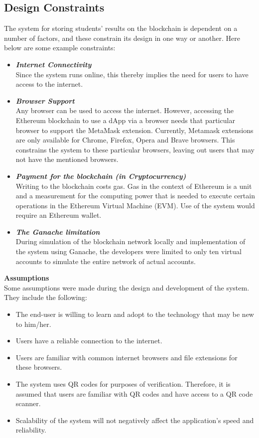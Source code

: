 \subsection{Design Constraints}
The system for storing students' results on the blockchain is dependent on a number of factors, and these constrain its design in one way or another. Here below are some example constraints: 
\begin{itemize}
\item \textbf{\textit{Internet Connectivity}}\\
Since the system runs online, this thereby implies the need for users to have access to the internet.
\item \textbf{\textit{Browser Support}}\\
Any browser can be used to access the internet. However, accessing the Ethereum blockchain to use a dApp via a browser needs that particular browser to support the MetaMask extension. Currently, Metamask extensions are only available for Chrome, Firefox, Opera and Brave browsers. This constrains the system to these particular browsers, leaving out users that may not have the mentioned browsers.
\item \textbf{\textit{Payment for the blockchain (in Cryptocurrency)}}\\
Writing to the blockchain costs gas. Gas in the context of Ethereum is a unit and a measurement for the computing power that is needed to execute certain operations in the Ethereum Virtual Machine (EVM). Use of the system would require an Ethereum wallet\cite{art21}.
\item \textbf{\textit{The Ganache limitation}}\\
During simulation of the blockchain network locally and implementation of the system using Ganache, the developers were limited to only ten virtual accounts to simulate the entire network of actual accounts.
\end{itemize}
\textbf{Assumptions}\\
Some assumptions were made during the design and development of the system. They include the following:\\
\begin{itemize}
\item The end-user is willing to learn and adopt to the technology that may be new to him/her.
\item Users have a reliable connection to the internet.
\item Users are familiar with common internet browsers and file extensions for these browsers.
\item The system uses QR codes for purposes of verification. Therefore, it is assumed that users are familiar with QR codes and have access to a QR code scanner.
\item Scalability of the system will not negatively affect the application’s speed and reliability.
\end{itemize}


